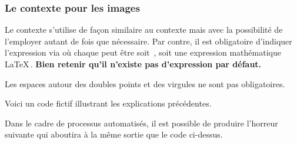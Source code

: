 \documentclass[10pt, a4paper]{article}
\begin{document}

\subsubsection{Le contexte  pour les images}

Le contexte  s'utilise de façon similaire au contexte  mais avec la possibilité de l'employer autant de fois que nécessaire.
Par contre, il est obligatoire d'indiquer l'expression  via 
où chaque  peut être soit \,, soit une expression mathématique \LaTeX\,.
\textbf{Bien retenir qu'il n'existe pas d'expression par défaut.}




\begin{tdocnote}
    Les espaces autour des doubles points et des virgules ne sont pas obligatoires.
\end{tdocnote}




Voici un code fictif illustrant les explications précédentes.



Dans le cadre de processus automatisés, il est possible de produire l'horreur suivante qui aboutira à la même sortie que le code ci-dessus.

\end{document}
